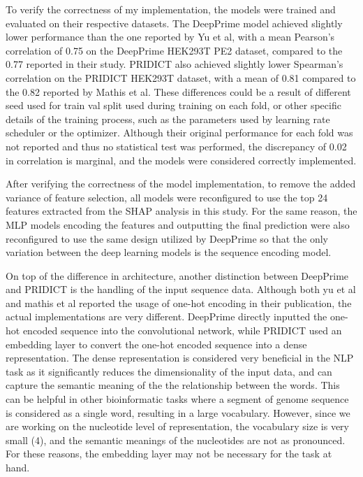 To verify the correctness of my implementation, the models were trained and evaluated on their respective datasets. The DeepPrime model achieved slightly lower performance than the one reported by Yu et al, with a mean Pearson's correlation of 0.75 on the DeepPrime HEK293T PE2 dataset, compared to the 0.77 reported in their study. PRIDICT also achieved slightly lower Spearman's correlation on the PRIDICT HEK293T dataset, with a mean of 0.81 compared to the 0.82 reported by Mathis et al. These differences could be a result of different seed used for train val split used during training on each fold, or other specific details of the training process, such as the parameters used by learning rate scheduler or the optimizer. Although their original performance for each fold was not reported and thus no statistical test was performed, the discrepancy of 0.02 in correlation is marginal, and the models were considered correctly implemented.

After verifying the correctness of the model implementation, to remove the added variance of feature selection, all models were reconfigured to use the top 24 features extracted from the SHAP analysis in this study. For the same reason, the MLP models encoding the features and outputting the final prediction were also reconfigured to use the same design utilized by DeepPrime so that the only variation between the deep learning models is the sequence encoding model. 

On top of the difference in architecture, another distinction between DeepPrime and PRIDICT is the handling of the input sequence data. Although both yu et al and mathis et al reported the usage of one-hot encoding in their publication, the actual implementations are very different. DeepPrime directly inputted the one-hot encoded sequence into the convolutional network, while PRIDICT used an embedding layer to convert the one-hot encoded sequence into a dense representation. The dense representation is considered very beneficial in the NLP task as it significantly reduces the dimensionality of the input data, and can capture the semantic meaning of the the relationship between the words\cite{goldbergPrimerNeuralNetwork2015}. This can be helpful in other bioinformatic tasks where a segment of genome sequence is considered as a single word, resulting in a large vocabulary\cite{cegliaIdentificationTranscriptionalPrograms2023}. However, since we are working on the nucleotide level of representation, the vocabulary size is very small (4), and the semantic meanings of the nucleotides are not as pronounced. For these reasons, the embedding layer may not be necessary for the task at hand.

